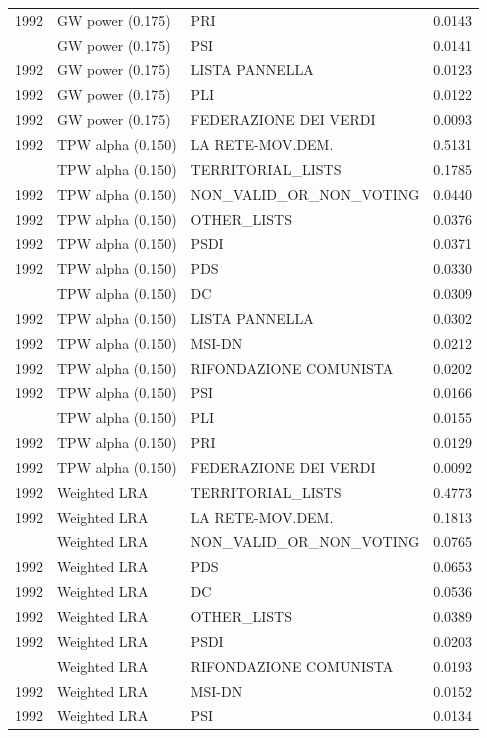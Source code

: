 \begin{longtable}[t]{rllr}
1992 & GW power (0.175) & PRI & 0.0143\\
\addlinespace
1992 & GW power (0.175) & PSI & 0.0141\\
1992 & GW power (0.175) & LISTA PANNELLA & 0.0123\\
1992 & GW power (0.175) & PLI & 0.0122\\
1992 & GW power (0.175) & FEDERAZIONE DEI VERDI & 0.0093\\
1992 & TPW alpha (0.150) & LA RETE-MOV.DEM. & 0.5131\\
\addlinespace
1992 & TPW alpha (0.150) & TERRITORIAL\_LISTS & 0.1785\\
1992 & TPW alpha (0.150) & NON\_VALID\_OR\_NON\_VOTING & 0.0440\\
1992 & TPW alpha (0.150) & OTHER\_LISTS & 0.0376\\
1992 & TPW alpha (0.150) & PSDI & 0.0371\\
1992 & TPW alpha (0.150) & PDS & 0.0330\\
\addlinespace
1992 & TPW alpha (0.150) & DC & 0.0309\\
1992 & TPW alpha (0.150) & LISTA PANNELLA & 0.0302\\
1992 & TPW alpha (0.150) & MSI-DN & 0.0212\\
1992 & TPW alpha (0.150) & RIFONDAZIONE COMUNISTA & 0.0202\\
1992 & TPW alpha (0.150) & PSI & 0.0166\\
\addlinespace
1992 & TPW alpha (0.150) & PLI & 0.0155\\
1992 & TPW alpha (0.150) & PRI & 0.0129\\
1992 & TPW alpha (0.150) & FEDERAZIONE DEI VERDI & 0.0092\\
1992 & Weighted LRA & TERRITORIAL\_LISTS & 0.4773\\
1992 & Weighted LRA & LA RETE-MOV.DEM. & 0.1813\\
\addlinespace
1992 & Weighted LRA & NON\_VALID\_OR\_NON\_VOTING & 0.0765\\
1992 & Weighted LRA & PDS & 0.0653\\
1992 & Weighted LRA & DC & 0.0536\\
1992 & Weighted LRA & OTHER\_LISTS & 0.0389\\
1992 & Weighted LRA & PSDI & 0.0203\\
\addlinespace
1992 & Weighted LRA & RIFONDAZIONE COMUNISTA & 0.0193\\
1992 & Weighted LRA & MSI-DN & 0.0152\\
1992 & Weighted LRA & PSI & 0.0134\\

\end{longtable}
